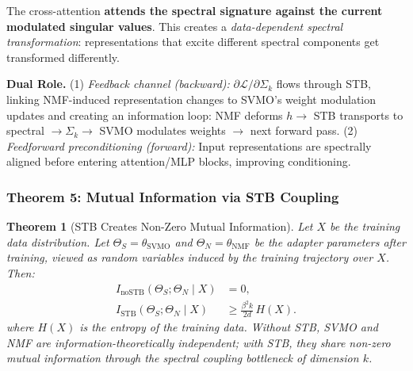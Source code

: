 \documentclass[conference]{IEEEtran}
\newtheorem{theorem}{Theorem}[section]
\begin{document}
The cross-attention \textbf{attends the spectral signature against the current modulated singular values}. This creates a \textit{data-dependent spectral transformation}: representations that excite different spectral components get transformed differently.

\textbf{Dual Role.} (1) \textit{Feedback channel (backward):} $\partial\mathcal{L}/\partial\Sigma_k$ flows through STB, linking NMF-induced representation changes to SVMO's weight modulation updates and creating an information loop: NMF deforms $h \to$ STB transports to spectral $\to \Sigma_k \to$ SVMO modulates weights $\to$ next forward pass. (2) \textit{Feedforward preconditioning (forward):} Input representations are spectrally aligned before entering attention/MLP blocks, improving conditioning.

\subsubsection{Theorem 5: Mutual Information via STB Coupling}

\begin{theorem}[STB Creates Non-Zero Mutual Information]
\label{thm:stb-mi}
Let $X$ be the training data distribution. Let $\Theta_S = \theta_{\text{SVMO}}$ and $\Theta_N = \theta_{\text{NMF}}$ be the adapter parameters after training, viewed as random variables induced by the training trajectory over $X$. Then:
\begin{align}
I_{\mathrm{no\!STB}}(\Theta_S; \Theta_N \mid X) &= 0, \label{eq:no-stb-mi}\\
I_{\mathrm{STB}}(\Theta_S; \Theta_N \mid X) &\geq \frac{\beta^2 k}{2d}\,H(X). \label{eq:stb-mi}
\end{align}
where $H(X)$ is the entropy of the training data. Without STB, SVMO and NMF are information-theoretically independent; with STB, they share non-zero mutual information through the spectral coupling bottleneck of dimension $k$.
\end{theorem}
\end{document}
